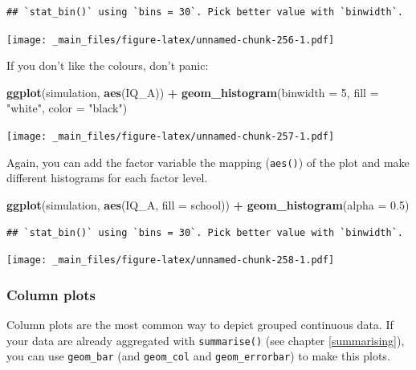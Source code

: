 \documentclass[
]{scrartcl}
\newenvironment{Shaded}{\begin{snugshade}}{\end{snugshade}}
\newcommand{\AttributeTok}[1]{\textcolor[rgb]{0.13,0.29,0.53}{#1}}
\newcommand{\DecValTok}[1]{\textcolor[rgb]{0.00,0.00,0.81}{#1}}
\newcommand{\FloatTok}[1]{\textcolor[rgb]{0.00,0.00,0.81}{#1}}
\newcommand{\FunctionTok}[1]{\textcolor[rgb]{0.13,0.29,0.53}{\textbf{#1}}}
\newcommand{\NormalTok}[1]{#1}
\newcommand{\SpecialCharTok}[1]{\textcolor[rgb]{0.81,0.36,0.00}{\textbf{#1}}}
\newcommand{\StringTok}[1]{\textcolor[rgb]{0.31,0.60,0.02}{#1}}
\begin{document}
\begin{verbatim}
## `stat_bin()` using `bins = 30`. Pick better value with `binwidth`.
\end{verbatim}

\texttt{[image: \_main\_files/figure-latex/unnamed-chunk-256-1.pdf]}

If you don't like the colours, don't panic:

\begin{Shaded}
\begin{Highlighting}[]
\FunctionTok{ggplot}\NormalTok{(simulation, }\FunctionTok{aes}\NormalTok{(IQ\_A)) }\SpecialCharTok{+}
    \FunctionTok{geom\_histogram}\NormalTok{(}\AttributeTok{binwidth =} \DecValTok{5}\NormalTok{, }\AttributeTok{fill =} \StringTok{"white"}\NormalTok{, }\AttributeTok{color =} \StringTok{"black"}\NormalTok{)}
\end{Highlighting}
\end{Shaded}

\texttt{[image: \_main\_files/figure-latex/unnamed-chunk-257-1.pdf]}

Again, you can add the factor variable the mapping (\texttt{aes()}) of the plot and make different histograms for each factor level.

\begin{Shaded}
\begin{Highlighting}[]
\FunctionTok{ggplot}\NormalTok{(simulation, }\FunctionTok{aes}\NormalTok{(IQ\_A, }\AttributeTok{fill =}\NormalTok{ school)) }\SpecialCharTok{+}
      \FunctionTok{geom\_histogram}\NormalTok{(}\AttributeTok{alpha =} \FloatTok{0.5}\NormalTok{)}
\end{Highlighting}
\end{Shaded}

\begin{verbatim}
## `stat_bin()` using `bins = 30`. Pick better value with `binwidth`.
\end{verbatim}

\texttt{[image: \_main\_files/figure-latex/unnamed-chunk-258-1.pdf]}

\subsubsection{Column plots}\label{column-plots}

Column plots are the most common way to depict grouped continuous data. If your data are already aggregated with \texttt{summarise()} (see chapter \ref{summarising}), you can use \texttt{geom\_bar} (and \texttt{geom\_col} and \texttt{geom\_errorbar}) to make this plots.
\end{document}
